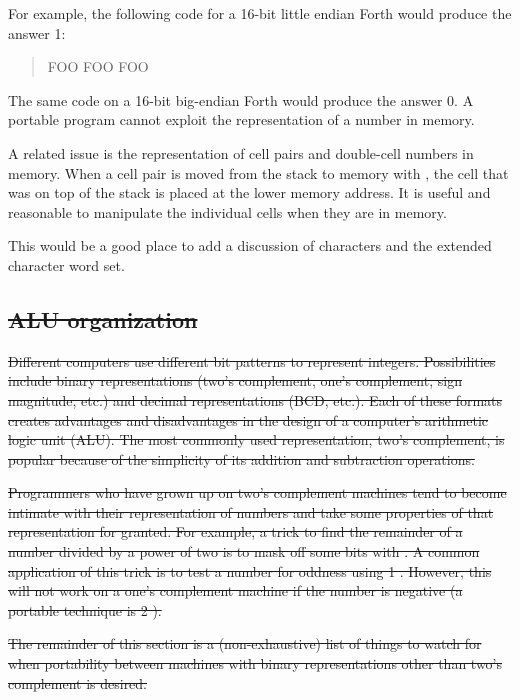 For example, the following code for a 16-bit little endian Forth
would produce the answer 1:
\begin{quote}\ttfamily
	 FOO
	 FOO \word{!}
	\quad FOO 
\end{quote}

The same code on a 16-bit big-endian Forth would produce the
answer 0. A portable program cannot exploit the representation
of a number in memory.

A related issue is the representation of cell pairs and double-cell
numbers in memory. When a cell pair is moved from the stack to memory
with , the cell that was on top of the stack is placed at the
lower memory address. It is useful and reasonable to manipulate the
individual cells when they are in memory.

\ifrelease\else
\begin{editor}
This would be a good place to add a discussion
of characters and the extended character word set.
\end{editor}
\fi

\cbstart{}
\subsection[ALU organization]{\sout{ALU organization}} %
\label{port:ALU}

\sout{%
Different computers use different bit patterns to represent integers.
Possibilities include binary representations (two's complement, one's
complement, sign magnitude, etc.) and decimal representations (BCD,
etc.). Each of these formats creates advantages and disadvantages in
the design of a computer's arithmetic logic unit (ALU). The most
commonly used representation, two's complement, is popular because of
the simplicity of its addition and subtraction operations.
}

\sout{%
Programmers who have grown up on two's complement machines tend to
become intimate with their representation of numbers and take some
properties of that representation for granted. For example, a trick
to find the remainder of a number divided by a power of two is to mask
off some bits with . A common application of this trick is
to test a number for oddness using 1 . However, this will
not work on a one's complement machine if the number is negative (a
portable technique is 2 ).
}

\sout{%
The remainder of this section is a (non-exhaustive) list of things to
watch for when portability between machines with binary representations
other than two's complement is desired.
}

